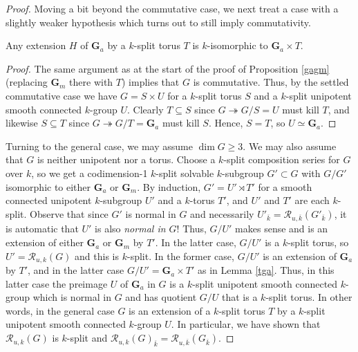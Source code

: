 \documentclass[10pt]{article}
\renewcommand{\(}{\left(}
\renewcommand{\)}{\right)}
\numberwithin{thm}{subsection}
\begin{document}
\begin{proof}
Moving a bit beyond the commutative case, we next treat a 
case with a slightly weaker hypothesis which turns out to still imply commutativity.

\begin{lemma}\label{tga} Any extension $H$ of $\mathbf{G}_a$ by
a $k$-split torus $T$ is $k$-isomorphic to 
$\mathbf{G}_a \times T$. 
\end{lemma}

\begin{proof}
The same argument as at the start of the proof of Proposition \ref{gagm} (replacing
$\mathbf{G}_m$ there with $T$) implies that $G$ is commutative.
Thus, by the settled commutative case we have $G = S \times U$
for a $k$-split torus $S$ and a $k$-split unipotent smooth connected
$k$-group $U$.  Clearly $T \subseteq S$ since $G \twoheadrightarrow G/S = U$ must kill
$T$, and likewise $S \subseteq T$ since $G \twoheadrightarrow G/T = \mathbf{G}_a$ must
kill $S$.  Hence, $S = T$, so $U \simeq \mathbf{G}_a$. 
\end{proof}

Turning to the general case, we may assume $\dim G \ge 3$.  We may also 
assume that $G$ is neither unipotent nor a torus.  
Choose a $k$-split composition series for $G$ over $k$, so 
we get a codimension-1 $k$-split solvable $k$-subgroup
$G' \subset G$ with $G/G'$ isomorphic to either $\mathbf{G}_a$ or $\mathbf{G}_m$. 
By induction, $G' = U' \rtimes T'$ for a smooth connected unipotent
$k$-subgroup $U'$ and a $k$-torus $T'$, and $U'$ and $T'$ are each $k$-split. 
Observe that since $G'$ is normal in $G$
and necessarily $U'_{\overline{k}} = \mathscr{R}_{u,\overline{k}}(G'_{\overline{k}})$,
it is automatic that $U'$ is also {\em normal in $G$}!
Thus, $G/U'$ makes sense and is an extension of either
$\mathbf{G}_a$ or $\mathbf{G}_m$ by $T'$.    In the latter case,
$G/U'$ is a $k$-split torus, so $U' = \mathscr{R}_{u,k}(G)$ and this is $k$-split.
In the former case, $G/U'$ is an extension of $\mathbf{G}_a$ by
$T'$, and in the latter case $G/U' = \mathbf{G}_a \times T'$
as in Lemma \ref{tga}.  Thus, in this latter case 
the preimage $U$ of $\mathbf{G}_a$ in $G$ is a $k$-split
unipotent smooth connected $k$-group which is
normal in $G$ and has quotient $G/U$ that is a $k$-split torus.
In other words, in the general case $G$ is an extension of
a $k$-split torus $T$ by a $k$-split unipotent smooth
connected $k$-group $U$.   In particular, we have shown
that $\mathscr{R}_{u,k}(G)$ is $k$-split and
$\mathscr{R}_{u,k}(G)_{\overline{k}} = \mathscr{R}_{u,\overline{k}}(G_{\overline{k}})$. 


\end{proof}
\end{document}
